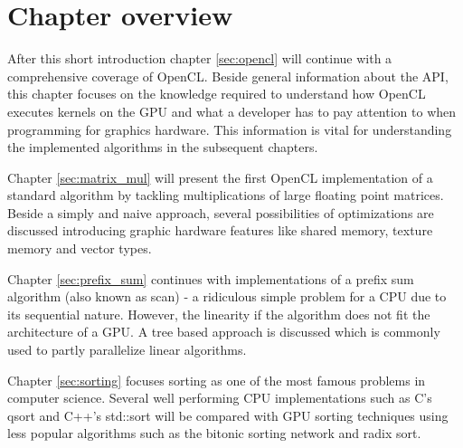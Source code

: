 \section{Chapter overview}

After this short introduction chapter \ref{sec:opencl} will continue with a comprehensive coverage of OpenCL. Beside general information about the API, this chapter focuses on the knowledge required to understand how OpenCL executes kernels on the GPU and what a developer has to pay attention to when programming for graphics hardware. This information is vital for understanding the implemented algorithms in the subsequent chapters.

Chapter \ref{sec:matrix_mul} will present the first OpenCL implementation of a standard algorithm by tackling multiplications of large floating point matrices. Beside a simply and naive approach, several possibilities of optimizations are discussed introducing graphic hardware features like shared memory, texture memory and vector types.

\pagebreak

Chapter \ref{sec:prefix_sum} continues with implementations of a prefix sum algorithm (also known as scan) - a ridiculous simple problem for a CPU due to its sequential nature. However, the linearity if the algorithm does not fit the architecture of a GPU. A tree based approach is discussed which is commonly used to partly parallelize linear algorithms.

Chapter \ref{sec:sorting} focuses sorting as one of the most famous problems in computer science. Several well performing CPU implementations such as C's qsort and C++'s std::sort will be compared with GPU sorting techniques using less popular algorithms such as the bitonic sorting network and radix sort.
